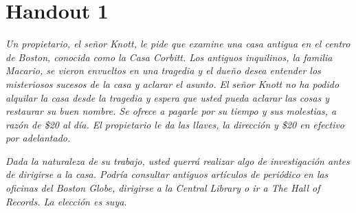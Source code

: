 \chapter{Handout 1}

\emph{Un propietario, el señor Knott, le pide que examine una casa antigua en el centro de Boston, conocida como la Casa Corbitt. Los antiguos inquilinos, la
familia Macario, se vieron envueltos en una tragedia y el dueño desea entender
los misteriosos sucesos de la casa y aclarar el asunto. El señor Knott no ha
podido alquilar la casa desde la tragedia y espera que usted pueda aclarar las
cosas y restaurar su buen nombre. Se ofrece a pagarle por su tiempo y sus
molestias, a razón de \$20 al día. El propietario le da las llaves, la dirección y \$20 en efectivo por adelantado.}

\emph{Dada la naturaleza de su trabajo, usted querrá realizar algo de
investigación antes de dirigirse a la casa. Podría consultar antiguos artículos
de periódico en las oficinas del \emph{Boston Globe}, dirigirse a la
\emph{Central Library} o ir a \emph{The Hall of Records}. La elección es suya.}

